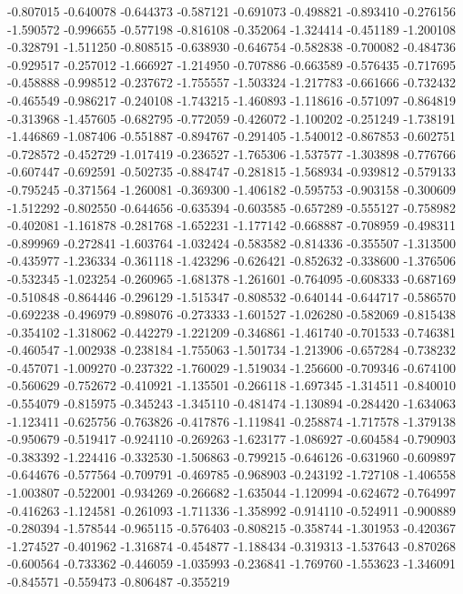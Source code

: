 -0.807015
-0.640078
-0.644373
-0.587121
-0.691073
-0.498821
-0.893410
-0.276156
-1.590572
-0.996655
-0.577198
-0.816108
-0.352064
-1.324414
-0.451189
-1.200108
-0.328791
-1.511250
-0.808515
-0.638930
-0.646754
-0.582838
-0.700082
-0.484736
-0.929517
-0.257012
-1.666927
-1.214950
-0.707886
-0.663589
-0.576435
-0.717695
-0.458888
-0.998512
-0.237672
-1.755557
-1.503324
-1.217783
-0.661666
-0.732432
-0.465549
-0.986217
-0.240108
-1.743215
-1.460893
-1.118616
-0.571097
-0.864819
-0.313968
-1.457605
-0.682795
-0.772059
-0.426072
-1.100202
-0.251249
-1.738191
-1.446869
-1.087406
-0.551887
-0.894767
-0.291405
-1.540012
-0.867853
-0.602751
-0.728572
-0.452729
-1.017419
-0.236527
-1.765306
-1.537577
-1.303898
-0.776766
-0.607447
-0.692591
-0.502735
-0.884747
-0.281815
-1.568934
-0.939812
-0.579133
-0.795245
-0.371564
-1.260081
-0.369300
-1.406182
-0.595753
-0.903158
-0.300609
-1.512292
-0.802550
-0.644656
-0.635394
-0.603585
-0.657289
-0.555127
-0.758982
-0.402081
-1.161878
-0.281768
-1.652231
-1.177142
-0.668887
-0.708959
-0.498311
-0.899969
-0.272841
-1.603764
-1.032424
-0.583582
-0.814336
-0.355507
-1.313500
-0.435977
-1.236334
-0.361118
-1.423296
-0.626421
-0.852632
-0.338600
-1.376506
-0.532345
-1.023254
-0.260965
-1.681378
-1.261601
-0.764095
-0.608333
-0.687169
-0.510848
-0.864446
-0.296129
-1.515347
-0.808532
-0.640144
-0.644717
-0.586570
-0.692238
-0.496979
-0.898076
-0.273333
-1.601527
-1.026280
-0.582069
-0.815438
-0.354102
-1.318062
-0.442279
-1.221209
-0.346861
-1.461740
-0.701533
-0.746381
-0.460547
-1.002938
-0.238184
-1.755063
-1.501734
-1.213906
-0.657284
-0.738232
-0.457071
-1.009270
-0.237322
-1.760029
-1.519034
-1.256600
-0.709346
-0.674100
-0.560629
-0.752672
-0.410921
-1.135501
-0.266118
-1.697345
-1.314511
-0.840010
-0.554079
-0.815975
-0.345243
-1.345110
-0.481474
-1.130894
-0.284420
-1.634063
-1.123411
-0.625756
-0.763826
-0.417876
-1.119841
-0.258874
-1.717578
-1.379138
-0.950679
-0.519417
-0.924110
-0.269263
-1.623177
-1.086927
-0.604584
-0.790903
-0.383392
-1.224416
-0.332530
-1.506863
-0.799215
-0.646126
-0.631960
-0.609897
-0.644676
-0.577564
-0.709791
-0.469785
-0.968903
-0.243192
-1.727108
-1.406558
-1.003807
-0.522001
-0.934269
-0.266682
-1.635044
-1.120994
-0.624672
-0.764997
-0.416263
-1.124581
-0.261093
-1.711336
-1.358992
-0.914110
-0.524911
-0.900889
-0.280394
-1.578544
-0.965115
-0.576403
-0.808215
-0.358744
-1.301953
-0.420367
-1.274527
-0.401962
-1.316874
-0.454877
-1.188434
-0.319313
-1.537643
-0.870268
-0.600564
-0.733362
-0.446059
-1.035993
-0.236841
-1.769760
-1.553623
-1.346091
-0.845571
-0.559473
-0.806487
-0.355219
